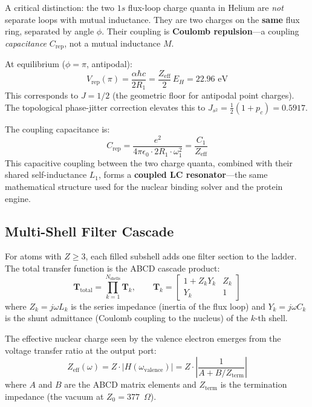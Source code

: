 A critical distinction: the two $1s$ flux-loop charge quanta in Helium are \emph{not} separate loops with mutual inductance. They are two charges on the \textbf{same} flux ring, separated by angle $\phi$. Their coupling is \textbf{Coulomb repulsion}---a coupling \emph{capacitance} $C_\text{rep}$, not a mutual inductance $M$.

At equilibrium ($\phi = \pi$, antipodal):
\begin{equation}
    V_\text{rep}(\pi) = \frac{\alpha \hbar c}{2R_1} = \frac{Z_\text{eff}}{2}\,E_H = 22.96 \text{ eV}
\end{equation}
This corresponds to $J = 1/2$ (the geometric floor for antipodal point charges). The topological phase-jitter correction elevates this to $J_{s^2} = \frac{1}{2}(1 + p_c) = 0.5917$.

The coupling capacitance is:
\begin{equation}
    C_\text{rep} = \frac{e^2}{4\pi\epsilon_0 \cdot 2R_1 \cdot \omega_1^2} = \frac{C_1}{Z_\text{eff}}
\end{equation}
This capacitive coupling between the two charge quanta, combined with their shared self-inductance $L_1$, forms a \textbf{coupled LC resonator}---the same mathematical structure used for the nuclear binding solver and the protein engine.

\subsection{Multi-Shell Filter Cascade}

For atoms with $Z \geq 3$, each filled subshell adds one filter section to the ladder. The total transfer function is the ABCD cascade product:
\begin{equation}
    \mathbf{T}_\text{total} = \prod_{k=1}^{N_\text{shells}} \mathbf{T}_k, \qquad
    \mathbf{T}_k = \begin{bmatrix} 1 + Z_k Y_k & Z_k \\ Y_k & 1 \end{bmatrix}
\end{equation}
where $Z_k = j\omega L_k$ is the series impedance (inertia of the flux loop) and $Y_k = j\omega C_k$ is the shunt admittance (Coulomb coupling to the nucleus) of the $k$-th shell.

The effective nuclear charge seen by the valence electron emerges from the voltage transfer ratio at the output port:
\begin{equation}
    Z_\text{eff}(\omega) = Z \cdot |H(\omega_\text{valence})| = Z \cdot \left|\frac{1}{A + B/Z_\text{term}}\right|
\end{equation}
where $A$ and $B$ are the ABCD matrix elements and $Z_\text{term}$ is the termination impedance (the vacuum at $Z_0 = 377$~$\Omega$).

